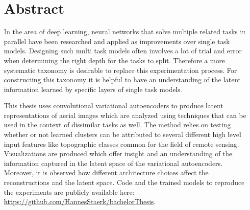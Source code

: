 \section{Abstract}


In the area of deep learning, neural networks that solve multiple related tasks in parallel have been
researched and applied as improvements over single task models. Designing such multi task
models often involves a lot of trial and error when determining the right depth for the tasks
to split. Therefore a more systematic taxonomy is desirable to replace this experimentation process.
For constructing this taxonomy it is helpful to have an understanding of the latent information 
learned by specific layers of single task models.

This thesis uses convolutional variational autoencoders to produce latent representations of 
aerial images which are analyzed using techniques that can be used in the context of dissimilar
tasks as well. The method relies on testing whether or not learned clusters can be attributed to
several different high level input features like topographic classes common for the field
of remote sensing. Visualizations are produced which offer insight and an understanding of the
information captured in the latent space of the variational autoencoders.
Moreover, it is observed how different architecture choices affect the reconstructions and the
latent space.
Code and the trained models to reproduce the experiments are publicly available here:
\href{https://github.com/HannesStaerk/bachelorThesis}{https://github.com/HannesStaerk/bachelorThesis}.



